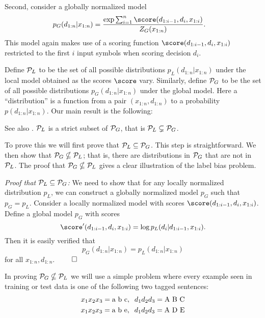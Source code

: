 Second, consider a globally normalized model
\begin{align*}
&p_G(d_{1:n} | x_{1:n}) 
= \frac{\exp \sum_{i=1}^n \score(d_{1:i-1},d_i, x_{1:i}) }
{Z_G(x_{1:n})}.
\end{align*}
This model again makes use of a scoring function $\score(d_{1:i-1},
d_i, x_{1:i})$ restricted to the first $i$ input symbols when
scoring decision $d_i$.

Define ${\cal P}_L$ to be the set of all possible distributions
$p_L(d_{1:n} | x_{1:n})$ under the local model obtained
as the scores $\score$ vary. Similarly, define ${\cal P}_G$ to be the
set of all possible distributions $p_G(d_{1:n} | x_{1:n})$
under the global model. Here a ``distribution'' is a function
from a pair $(x_{1:n}, d_{1:n})$ to a probability
$p(d_{1:n} | x_{1:n})$.
Our main result is the following:

\begin{theorem} See also .
\hspace*{0.5cm}${\cal P}_L$ is a strict subset of ${\cal P}_G$, that is ${\cal P}_L
  \subsetneq {\cal P}_G$.
\end{theorem}

To prove this we will first prove that ${\cal P}_L \subseteq {\cal
  P}_G$. This step is straightforward. We then show that
${\cal P}_G \nsubseteq {\cal P}_L$; that is, there are distributions
in ${\cal P}_G$ that are not in ${\cal P}_L$.
The proof that ${\cal P}_G \nsubseteq {\cal P}_L$ gives a clear
illustration of the label bias problem.


{\em Proof that ${\cal P}_L \subseteq {\cal P}_G$:} 
We need to show that for any locally normalized
distribution $p_L$, we can construct a globally normalized model $p_G$
such that $p_G = p_L$.
Consider a locally normalized model with scores
$\score(d_{1:i-1}, d_i, x_{1:i})$.
Define a global model $p_G$ with scores
\[
\score'(d_{1:i-1}, d_i, x_{1:i}) = 
\log p_L(d_i | d_{1:i-1}, x_{1:i}).
\]
Then it is easily verified that 
\[p_G(d_{1:n} | x_{1:n}) = 
p_L(d_{1:n} | x_{1:n}) \]
for all $x_{1:n}, d_{1:n}$.
$\qed$

In proving ${\cal P}_G \nsubseteq {\cal P}_L$ we will use a
simple problem where every example seen in training or test data is
one of the following two tagged sentences:
\begin{align}
x_1 x_2 x_3 = \hbox{a b c}, \;\;d_1 d_2 d_3 = \hbox{A B C}
\nonumber \\
x_1 x_2 x_3 = \hbox{a b e}, \;\;d_1 d_2 d_3 = \hbox{A D E}
\label{eq:lbexample}
\end{align}

